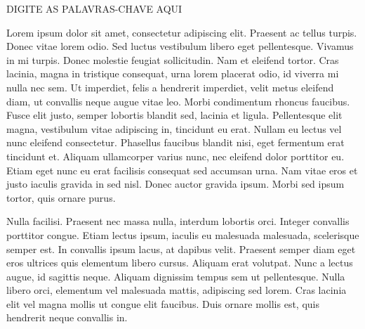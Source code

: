 \documentclass[msc, classic, a4paper]{ufbathesis}
\begin{document}
\abstract
\begin{keywords}
DIGITE AS PALAVRAS-CHAVE AQUI
\end{keywords}

\tableofcontents

\listoffigures

\listoftables

\mainmatter

% 
% 
% 
%


Lorem ipsum dolor sit amet, consectetur adipiscing elit. Praesent ac tellus turpis. Donec vitae lorem odio. Sed luctus vestibulum libero eget pellentesque. Vivamus in mi turpis. Donec molestie feugiat sollicitudin. Nam et eleifend tortor. Cras lacinia, magna in tristique consequat, urna lorem placerat odio, id viverra mi nulla nec sem. Ut imperdiet, felis a hendrerit imperdiet, velit metus eleifend diam, ut convallis neque augue vitae leo. Morbi condimentum rhoncus faucibus. Fusce elit justo, semper lobortis blandit sed, lacinia et ligula. Pellentesque elit magna, vestibulum vitae adipiscing in, tincidunt eu erat. Nullam eu lectus vel nunc eleifend consectetur. Phasellus faucibus blandit nisi, eget fermentum erat tincidunt et. Aliquam ullamcorper varius nunc, nec eleifend dolor porttitor eu. Etiam eget nunc eu erat facilisis consequat sed accumsan urna. Nam vitae eros et justo iaculis gravida in sed nisl. Donec auctor gravida ipsum. Morbi sed ipsum tortor, quis ornare purus.

Nulla facilisi. Praesent nec massa nulla, interdum lobortis orci. Integer convallis porttitor congue. Etiam lectus ipsum, iaculis eu malesuada malesuada, scelerisque semper est. In convallis ipsum lacus, at dapibus velit. Praesent semper diam eget eros ultrices quis elementum libero cursus. Aliquam erat volutpat. Nunc a lectus augue, id sagittis neque. Aliquam dignissim tempus sem ut pellentesque. Nulla libero orci, elementum vel malesuada mattis, adipiscing sed lorem. Cras lacinia elit vel magna mollis ut congue elit faucibus. Duis ornare mollis est, quis hendrerit neque convallis in.
\end{document}
